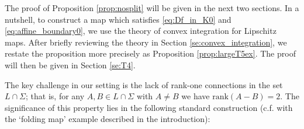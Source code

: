 \documentclass[titlepage]{amsart}
\numberwithin{equation}{section}
\theoremstyle{plain}
\theoremstyle{definition}
\theoremstyle{remark}
\newcommand{\R}{\mathbb{R}}
\newcommand{\green}[1]{{\color{ForestGreen}{#1}}}
\begin{document}


\bigskip

The proof of Proposition \ref{prop:nosplit} will be given in the next two sections. In a nutshell, to construct a map which satisfies  \eqref{eq:Df_in_K0}  and  \eqref{eq:affine_boundary0}, we use
the theory of convex integration for  Lipschitz maps. After briefly reviewing the theory in Section \ref{se:convex_integration}, we restate the proposition more precisely as Proposition \ref{prop:largeT5ex}. The proof will then be given in Section \ref{se:T4}.

The key challenge in our setting is the lack of rank-one connections in the set $L\cap \Sigma$; that is, for any $A,B\in L\cap \Sigma$ with $A\neq B$ we have $\textrm{rank}(A-B)=2$. The significance of this property lies in the following standard construction (c.f. with the `folding map' example described in the introduction):
\end{document}
